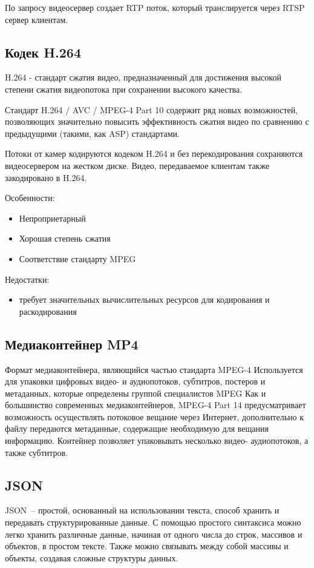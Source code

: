По запросу видеосервер создает RTP поток, который транслируется через RTSP сервер клиентам.

\subsection{Кодек H.264}
H.264 - стандарт сжатия видео, предназначенный для достижения высокой степени сжатия видеопотока
при сохранении высокого качества.

Стандарт H.264 / AVC / MPEG-4 Part 10 содержит ряд новых возможностей, позволяющих значительно
повысить эффективность сжатия видео по сравнению с предыдущими (такими, как ASP) стандартами.

Потоки от камер кодируются кодеком H.264 и без перекодирования сохраняются видеосервером на
жестком диске. Видео, передаваемое клиентам также закодировано в H.264.

\medskip

Особенности:
\smallskip
\begin{itemize}
	\item Непроприетарный
	\item Хорошая степень сжатия
	\item Соответствие стандарту MPEG
\end{itemize}

\medskip

Недостатки:
\smallskip
\begin{itemize}
	\item требует значительных вычислительных ресурсов для кодирования и раскодирования
\end{itemize}

\subsection{Медиаконтейнер MP4}
Формат медиаконтейнера, являющийся частью стандарта MPEG-4
Используется для упаковки цифровых видео- и аудиопотоков, субтитров, постеров и метаданных,
которые определены группой специалистов MPEG
Как и большинство современных медиаконтейнеров, MPEG-4 Part 14 предусматривает возможность
осуществлять потоковое вещание через Интернет, дополнительно к файлу передаются метаданные,
содержащие необходимую для вещания информацию.
Контейнер позволяет упаковывать несколько видео- аудиопотоков, а также субтитров.

\subsection{JSON}
JSON~-- простой, основанный на использовании текста, способ хранить и передавать структурированные
данные. С помощью простого синтаксиса  можно легко хранить различные данные, начиная от одного числа
до строк, массивов и объектов, в простом тексте. Также можно связывать между собой массивы и объекты,
создавая сложные структуры данных.

